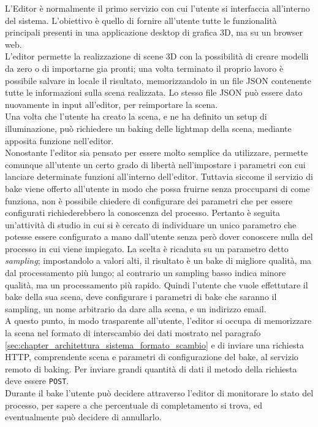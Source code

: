 L’Editor è normalmente il primo servizio con cui l’utente si interfaccia all’interno del sistema. L’obiettivo è quello di fornire all’utente tutte le funzionalità principali presenti in una applicazione desktop di grafica 3D, ma su un browser web.
\\
L’editor permette la realizzazione di scene 3D con la possibilità di creare modelli da zero o di importarne gia pronti; una volta terminato il proprio lavoro è possibile salvare in locale il risultato, memorizzandolo in un file JSON contenente tutte le informazioni sulla scena realizzata. Lo stesso file JSON può essere dato nuovamente in input all’editor, per reimportare la scena.
\\ 
Una volta che l’utente ha creato la scena, e ne ha definito un setup di illuminazione, può richiedere un baking delle lightmap della scena, mediante apposita funzione nell’editor.
\\
Nonostante l’editor sia pensato per essere molto semplice da utilizzare, permette comunque all’utente un certo grado di libertà nell’impostare i parametri con cui lanciare determinate funzioni all’interno dell’editor. Tuttavia siccome il servizio di bake viene offerto all’utente in modo che possa fruirne senza proccuparsi di come funziona, non è possibile chiedere di configurare dei parametri che per essere configurati richiederebbero la conoscenza del processo. Pertanto è seguita un’attività di studio in cui si è cercato di individuare un unico parametro che potesse essere configurato a mano dall’utente senza però dover conoscere nulla del processo in cui viene impiegato. La scelta è ricaduta su un parametro detto \emph{sampling}; impostandolo a valori alti, il risultato è un bake di migliore qualità, ma dal processamento più lungo; al contrario un sampling basso indica minore qualità, ma un processamento più rapido. Quindi l’utente che vuole effettutare il bake della sua scena, deve configurare i parametri di bake che saranno il sampling, un nome arbitrario da dare alla scena, e un indirizzo email.
\\
A questo punto, in modo trasparente all’utente, l’editor si occupa di memorizzare la scena nel formato di interscambio dei dati mostrato nel paragrafo \ref{sec:chapter_architettura_sistema_formato_scambio} e di inviare una richiesta HTTP, comprendente scena e parametri di configurazione del bake, al servizio remoto di baking. Per inviare grandi quantità di dati il metodo della richiesta deve essere \texttt{POST}.
\\
Durante il bake l’utente può decidere attraverso l’editor di monitorare lo stato del processo, per sapere a che percentuale di completamento si trova, ed eventualmente può decidere di annullarlo. 
